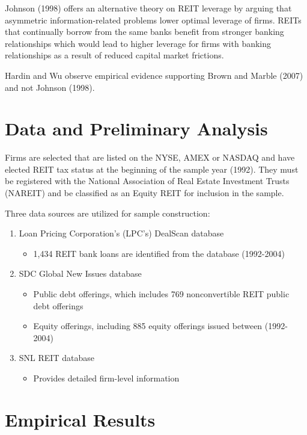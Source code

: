\documentclass[a4paper, 12pt]{article} %
\begin{document}
Johnson (1998) offers an alternative theory on REIT leverage by arguing that asymmetric information-related problems lower optimal leverage of firms. REITs that continually borrow from the same banks benefit from stronger banking relationships which would lead to higher leverage for firms with banking relationships as a result of reduced capital market frictions. 

Hardin and Wu observe empirical evidence supporting Brown and Marble (2007) and not Johnson (1998).


\section*{Data and Preliminary Analysis}

Firms are selected that are listed on the NYSE, AMEX or NASDAQ and have elected REIT tax status at the beginning of the sample year (1992). They must be registered with the National Association of Real Estate Investment Trusts (NAREIT) and be classified as an Equity REIT for inclusion in the sample.

Three data sources are utilized for sample construction:
\begin{enumerate}
\item Loan Pricing Corporation’s (LPC’s) DealScan database
\begin{itemize}
\item 1,434 REIT bank loans are identified from the database (1992-2004)
\end{itemize}
\item SDC Global New Issues database
\begin{itemize}
\item Public debt offerings, which includes 769 nonconvertible REIT public debt offerings
\item Equity offerings, including 885 equity offerings issued between (1992-2004)
\end{itemize}
\item SNL REIT database
\begin{itemize}
\item Provides detailed firm-level information
\end{itemize}
\end{enumerate}


\section*{Empirical Results}
\end{document}
